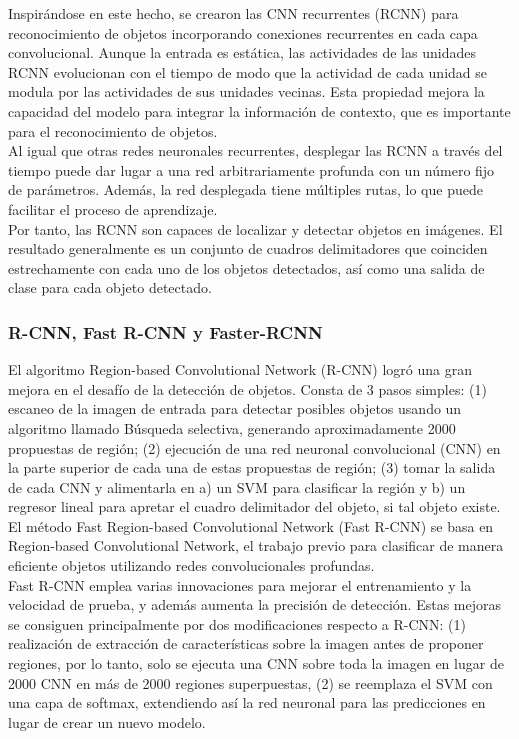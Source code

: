 \documentclass{bmvc2k}
\begin{document}
Inspirándose en este hecho, se crearon las CNN recurrentes (RCNN) para reconocimiento de objetos incorporando conexiones recurrentes en cada capa convolucional. Aunque la entrada es estática, las actividades de las unidades RCNN evolucionan con el tiempo
de modo que la actividad de cada unidad se modula por las actividades de sus unidades vecinas. Esta propiedad mejora la capacidad del modelo para integrar la información de contexto, que es importante para el reconocimiento de objetos.\\

Al igual que otras redes neuronales recurrentes, desplegar las RCNN a través del tiempo puede dar lugar a una red arbitrariamente profunda con un número fijo de parámetros. Además, la red desplegada tiene múltiples rutas, lo que puede facilitar el proceso de aprendizaje.\\

Por tanto, las RCNN son capaces de localizar y detectar objetos en imágenes.  El resultado generalmente es un conjunto de cuadros delimitadores que coinciden estrechamente con cada uno de los objetos detectados, así como una salida de clase para cada objeto detectado.\\

\subsubsection{R-CNN, Fast R-CNN y Faster-RCNN}

El algoritmo Region-based Convolutional Network (R-CNN) logró una gran mejora en el desafío de la detección de objetos. Consta de 3 pasos simples: (1) escaneo de la imagen de entrada para detectar posibles objetos usando un algoritmo llamado Búsqueda selectiva, generando aproximadamente 2000 propuestas de región; (2) ejecución de una red neuronal convolucional (CNN) en la parte superior de cada una de estas propuestas de región; (3) tomar la salida de cada CNN y alimentarla en a) un SVM para clasificar la región y b) un regresor lineal para apretar el cuadro delimitador del objeto, si tal objeto existe.\\

El método Fast Region-based Convolutional Network (Fast R-CNN) se basa en Region-based Convolutional Network, el trabajo previo para clasificar de manera eficiente objetos utilizando redes convolucionales profundas.\\

Fast R-CNN emplea varias innovaciones para mejorar el entrenamiento y la velocidad de prueba, y además aumenta la precisión de detección. Estas mejoras se consiguen principalmente por dos modificaciones respecto a R-CNN: (1) realización de extracción de características sobre la imagen antes de proponer regiones, por lo tanto, solo se ejecuta una CNN sobre toda la imagen en lugar de 2000 CNN en más de 2000 regiones superpuestas, (2) se reemplaza el SVM con una capa de softmax, extendiendo así la red neuronal para las predicciones en lugar de crear un nuevo modelo.\\
\end{document}
